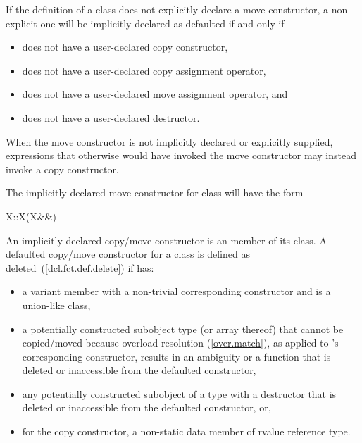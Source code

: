 \pnum
{}%
If the definition of a class  does not explicitly declare
a move constructor, a non-explicit one will be
implicitly declared as defaulted if and only if

\begin{itemize}
\item
{} does not have a user-declared copy constructor,

\item
{} does not have a user-declared copy assignment operator,

\item
{} does not have a user-declared move assignment operator, and

\item
{} does not have a user-declared destructor.
\end{itemize}

\enternote When the move constructor is not implicitly declared or explicitly supplied,
expressions that otherwise would have invoked the move constructor may instead invoke
a copy constructor. \exitnote

\pnum
The implicitly-declared move constructor for class  will have the form
\begin{codeblock}
X::X(X&&)
\end{codeblock}

\pnum
An implicitly-declared copy/move constructor is an
member of its class.
A defaulted copy/\brk{}move constructor for a class
   is defined as deleted~(\ref{dcl.fct.def.delete}) if  has:
\begin{itemize}
\item a variant member with a non-trivial corresponding constructor and
   is a union-like class,

\item a potentially constructed subobject type
   (or array thereof) that cannot be copied/moved because
  overload resolution (\ref{over.match}), as applied to
  's 
  corresponding constructor, results in an ambiguity or 
  a function that is deleted or inaccessible from the
  defaulted constructor,

\item any potentially constructed subobject of a type
  with a destructor that is deleted or inaccessible from the defaulted
  constructor, or,

\item for the copy constructor, a non-static data member of rvalue reference type.
\end{itemize}

